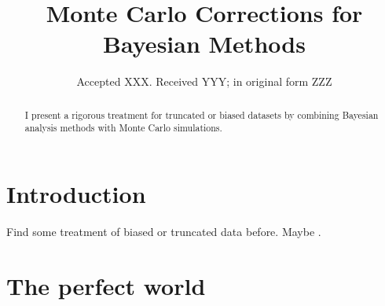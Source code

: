 \documentclass[a4paper,fleqn,usenatbib]{mnras}
\title[MC Corrections for Bayesian Methods]{Monte Carlo Corrections for Bayesian Methods}
\author[S. R. Hinton et al.]{Samuel R. Hinton,$^{1,2}$\thanks{E-mail: \href{samuelreay@gmail.com}}
\\
$^{1}$School of Mathematics and Physics, The University of Queensland, Brisbane, QLD 4072, Australia\\
$^{2}$ARC Centre of Excellence for All-sky Astrophysics (CAASTRO)
}
\date{Accepted XXX. Received YYY; in original form ZZZ}
\begin{document}
\label{firstpage}
\pagerange{\pageref{firstpage}--\pageref{lastpage}}
\maketitle



\begin{abstract}
I present a rigorous treatment for truncated or biased datasets by combining Bayesian analysis methods with Monte Carlo simulations.
\end{abstract}



\section{Introduction}

Find some treatment of biased or truncated data before. Maybe \citet{Gull1989bayesian}.

\section{The perfect world}
\end{document}
